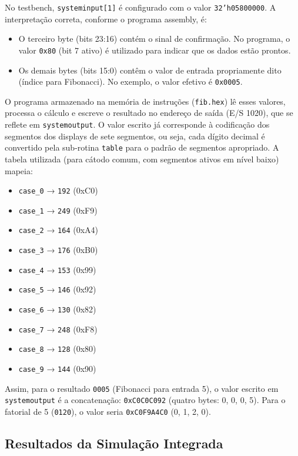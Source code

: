 \documentclass[
	12pt,				%
	oneside,
	a4paper,			%
	english,			%
	french,				%
	spanish,			%
	brazil,				%
	]{abntex2}
\begin{document}
No testbench, \texttt{systeminput[1]} é configurado com o valor \texttt{32'h05800000}. A interpretação correta, conforme o programa assembly, é:
\begin{itemize}
  \item O terceiro byte (bits 23:16) contém o sinal de confirmação. No programa, o valor \texttt{0x80} (bit 7 ativo) é utilizado para indicar que os dados estão prontos.
  \item Os demais bytes (bits 15:0) contêm o valor de entrada propriamente dito (índice para Fibonacci). No exemplo, o valor efetivo é \texttt{0x0005}.
\end{itemize}

O programa armazenado na memória de instruções (\texttt{fib.hex}) lê esses valores, processa o cálculo e escreve o resultado no endereço de saída (E/S 1020), que se reflete em \texttt{systemoutput}. O valor escrito já corresponde à codificação dos segmentos dos displays de sete segmentos, ou seja, cada dígito decimal é convertido pela sub-rotina \texttt{table} para o padrão de segmentos apropriado. A tabela utilizada (para cátodo comum, com segmentos ativos em nível baixo) mapeia:
\begin{itemize}
  \item \texttt{case\_0} → \texttt{192} (0xC0)
  \item \texttt{case\_1} → \texttt{249} (0xF9)
  \item \texttt{case\_2} → \texttt{164} (0xA4)
  \item \texttt{case\_3} → \texttt{176} (0xB0)
  \item \texttt{case\_4} → \texttt{153} (0x99)
  \item \texttt{case\_5} → \texttt{146} (0x92)
  \item \texttt{case\_6} → \texttt{130} (0x82)
  \item \texttt{case\_7} → \texttt{248} (0xF8)
  \item \texttt{case\_8} → \texttt{128} (0x80)
  \item \texttt{case\_9} → \texttt{144} (0x90)
\end{itemize}

Assim, para o resultado \texttt{0005} (Fibonacci para entrada 5), o valor escrito em \texttt{systemoutput} é a concatenação: \texttt{0xC0C0C092} (quatro bytes: 0, 0, 0, 5). Para o fatorial de 5 (\texttt{0120}), o valor seria \texttt{0xC0F9A4C0} (0, 1, 2, 0).

\subsection{Resultados da Simulação Integrada}
\end{document}
